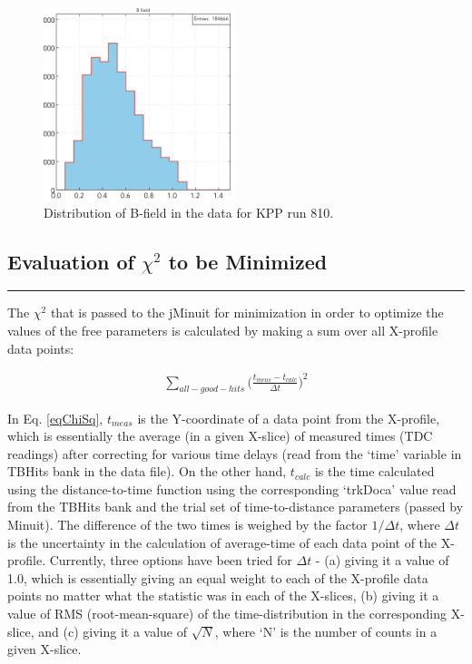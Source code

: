 \documentclass[12pt]{article}
\begin{document}
\begin{figure}
    \centering
    \includegraphics[width=0.5\textwidth]{Figures/bField_KPP_Run810.png}
    \caption{Distribution of B-field in the data for KPP run 810.}
    \label{fBfieldDist}
\end{figure}


\subsection{Evaluation of $\chi^2$ to be Minimized}
\label{ssChisqEval}
{\color{black} \rule{\linewidth}{0.5mm} }

The $\chi^2$ that is passed to the jMinuit for minimization in order to optimize the values of the free parameters is calculated by making a sum over all X-profile data points:

\begin{equation}
\label{eqChiSq}
\begin{aligned}
  \sum_{all-good-hits}^{}  \Bigg(   \frac{t_{meas} - t_{calc}}{ \Delta t} \Bigg)^2
\end{aligned}
\end{equation}

In Eq. \ref{eqChiSq}, $t_{meas}$ is the Y-coordinate of a data point from the X-profile, which is essentially the average (in a given X-slice) of measured times (TDC readings) after correcting for various time delays (read from the `time' variable in TBHits bank in the data file). On the other hand, $t_{calc}$ is the time calculated using the distance-to-time function using the corresponding `trkDoca'  value read from the TBHits bank and the trial set of time-to-distance parameters (passed by Minuit). The difference of the two times is weighed by the factor $1/\Delta t$, where $\Delta t$ is the uncertainty in the calculation of average-time of each data point of the X-profile. Currently, three options have been tried for $\Delta t$ - (a) giving it a value of 1.0, which is essentially giving an equal weight to each of the X-profile data points no matter what the statistic was in each of the X-slices, (b) giving it a value of RMS (root-mean-square) of the time-distribution in the corresponding X-slice, and (c) giving it a value of $\sqrt{N}$, where `N' is the number of counts in a given X-slice.
\end{document}
